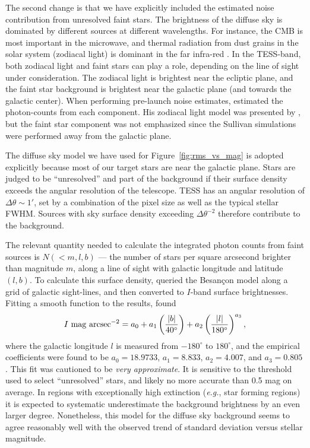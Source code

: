 \documentclass[12pt,twocolumn,tighten]{aastex62}
\begin{document}
The second change is that we have explicitly included the
estimated noise contribution from unresolved faint stars.  The
brightness of the diffuse sky is dominated by different sources at
different wavelengths.  For instance, the CMB is most important in
the microwave, and thermal radiation from dust grains in the solar
system (zodiacal light) is dominant in the far infra-red
\citep{leinert_1997_1998}.  In the TESS-band, both zodiacal light and
faint stars can play a role, depending on the line of sight under
consideration. The zodiacal light is brightest near the ecliptic
plane, and the faint star background is brightest near the galactic
plane (and towards the galactic center).  
When performing pre-launch noise estimates,
\citet{winn_background_2013}
estimated the photon-counts from each component.
His zodiacal light model was presented by \citet{Sullivan_et_al_2015},
but the faint star component was not emphasized since the Sullivan
simulations were performed away from the galactic plane.

The diffuse sky model we have used for Figure~\ref{fig:rms_vs_mag} is
adopted explicitly because most of our target stars are near the
galactic plane.
Stars are judged to be ``unresolved'' and part of the background if
their surface density exceeds the angular resolution of the telescope.
TESS has an angular resolution of $\Delta \theta \sim 1'$, set by a
combination of the pixel size as well as the typical stellar FWHM.
Sources with sky surface density exceeding $\Delta \theta^{-2}$
therefore contribute to the background.

The relevant quantity needed to calculate the integrated 
photon counts from faint sources
is  $N(<m,l,b)$ --- the number of stars per square arcsecond
brighter than magnitude $m$, along a line of sight with galactic
longitude and latitude $(l,b)$.
To calculate this surface density, \citet{winn_background_2013}
queried the Besan\c con model
\citep{robin_synthetic_2003}  along a grid of galactic sight-lines,
and then converted to $I$-band surface brightnesses.
Fitting a smooth function to the results, \citet{winn_background_2013}
found
\begin{equation}
I\ {\rm mag\ arcsec}^{-2} =
    a_0 + a_1 \left(\frac{|b|}{40^\circ}\right)
    + a_2 \left(\frac{|l|}{180^\circ}\right)^{a_3},
\end{equation}
where the galactic longitude $l$ is measured from $-180^\circ$ to
$180^\circ$, and the empirical coefficients were found to be $a_0 =
18.9733$, $a_1=8.833$, $a_2=4.007$, and $a_3=0.805$.  This fit was
cautioned to be {\it very approximate}.  It is sensitive to the
threshold used to select ``unresolved'' stars, and likely no more
accurate than 0.5 mag on average.  In regions with exceptionally high
extinction ({\it e.g.}, star forming regions) it is expected to
systematic underestimate the background brightness by an even larger
degree.
Nonetheless, this model for the diffuse sky background seems
to agree reasonably well with the observed trend of standard deviation
versus stellar magnitude.
\end{document}

